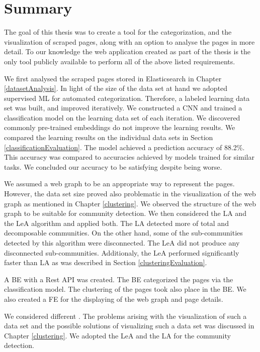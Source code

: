 \label{conclusion}
\section{Summary}
The goal of this thesis was to create a tool for the categorization, and the visualization of scraped pages, along with an option to analyse the pages in more detail. To our knowledge the web application created as part of the thesis is the only tool publicly available to perform all of the above listed requirements.

We first analysed the scraped pages stored in Elasticsearch in Chapter \ref{datasetAnalysis}. In light of the size of the data set at hand we adopted supervised ML for automated categorization. Therefore, a labeled learning data set was built, and improved iteratively. We constructed a CNN and trained a classification model on the learning data set of each iteration. We discovered commonly pre-trained embeddings do not improve the learning results. We compared the learning results on the individual data sets in Section \ref{classificationEvaluation}. The model achieved a prediction accuracy of 88.2\%. This accuracy was compared to accuracies achieved by models trained for similar tasks. We concluded our accuracy to be satisfying despite being worse.

 We assumed a web graph to be an appropriate way to represent the pages. However, the data set size proved also problematic in the visualization of the web graph as mentioned in Chapter \ref{clustering}. We observed the structure of the web graph to be suitable for community detection. We then considered the LA and the LeA algorithm and applied both. The LA detected more of total and decomposable communities. On the other hand, some of the sub-communities detected by this algorithm were disconnected. The LeA did not produce any disconnected sub-communities. Additionaly, the LeA performed significantly faster than LA as was described in Section \ref{clusteringEvaluation}.

A BE with a Rest API was created. The BE categorized the pages via the classification model. The clustering of the pages took also place in the BE. We also created a FE for the displaying of the web graph and page details. 

We considered different  . The problems arising with the visualization of such a data set and the possible solutions of visualizing such a data set was discussed in Chapter \ref{clustering}. We adopted the LeA and the LA for the community detection.

